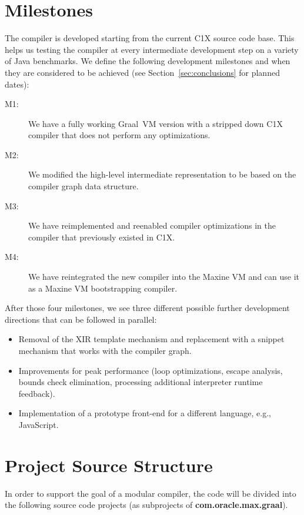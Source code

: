 \documentclass[twocolumn]{svjour3}
\begin{document}
\section{Milestones}
\label{sec:mile}
The compiler is developed starting from the current C1X source code base.
This helps us testing the compiler at every intermediate development step on a variety of Java benchmarks.
We define the following development milestones and when they are considered to be achieved (see Section~\ref{sec:conclusions} for planned dates):
\begin{description}
\item[M1:] We have a fully working Graal~VM version with a stripped down C1X compiler that does not perform any optimizations.
\item[M2:] We modified the high-level intermediate representation to be based on the compiler graph data structure.
\item[M3:] We have reimplemented and reenabled compiler optimizations in the compiler that previously existed in C1X.
\item[M4:] We have reintegrated the new compiler into the Maxine VM and can use it as a Maxine VM bootstrapping compiler.
\end{description}

After those four milestones, we see three different possible further development directions that can be followed in parallel:
\begin{itemize}
  \item Removal of the XIR template mechanism and replacement with a snippet mechanism that works with the compiler graph.
  \item Improvements for peak performance (loop optimizations, escape analysis, bounds check elimination, processing additional interpreter runtime feedback).
  \item Implementation of a prototype front-end for a different language, e.g., JavaScript.
\end{itemize}

\section{Project Source Structure}
In order to support the goal of a modular compiler, the code will be divided into the following source code projects (as subprojects of \textbf{com.oracle.max.graal}).
\end{document}
